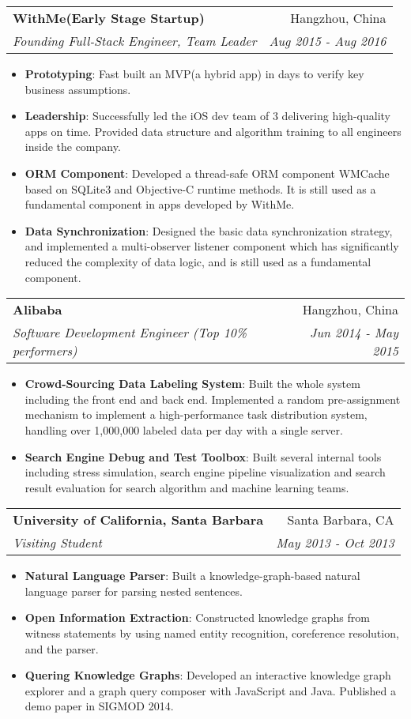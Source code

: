 \documentclass[letterpaper,9pt]{article}
\makeatletter
\newcommand{\resumeItem}[2]{
  \item\small{
    \textbf{#1}{: #2 \vspace{-2pt}}
  }
}
\newcommand{\resumeSubheading}[4]{
  \vspace{-1pt}\item
    \begin{tabular*}{0.97\textwidth}{l@{\extracolsep{\fill}}r}
      \textbf{#1} & #2 \\
      \textit{\small#3} & \textit{\small #4} \\
    \end{tabular*}\vspace{-5pt}
}
\newcommand{\resumeItemListStart}{\begin{itemize}}
\newcommand{\resumeItemListEnd}{\end{itemize}\vspace{-5pt}}
\makeatother
\begin{document}
    \resumeSubheading
      {WithMe(Early Stage Startup)}{Hangzhou, China}
      {Founding Full-Stack Engineer, Team Leader}{Aug 2015 - Aug 2016}
      \resumeItemListStart
        \resumeItem{Prototyping}
          {Fast built an MVP(a hybrid app) in days to verify key business assumptions.}
        \resumeItem{Leadership}
          {Successfully led the iOS dev team of 3 delivering high-quality apps on time. Provided data structure and  algorithm training to all engineers inside the company.}
        \resumeItem{ORM Component}
          {Developed a thread-safe ORM component WMCache based on SQLite3 and Objective-C runtime methods. It is still used as a fundamental component in apps developed by WithMe.}
        \resumeItem{Data Synchronization}
          {Designed the basic data synchronization strategy, and implemented a multi-observer listener component which has significantly reduced the complexity of data logic, and is still used as a fundamental component.}
      \resumeItemListEnd

    \resumeSubheading
      {Alibaba}{Hangzhou, China}
      {Software Development Engineer (Top 10\% performers)}{Jun 2014 - May 2015}
      \resumeItemListStart
        \resumeItem{Crowd-Sourcing Data Labeling System}
          {Built the whole system including the front end and back end. Implemented a random pre-assignment mechanism to implement a high-performance task distribution system, handling over 1,000,000 labeled data per day with a single server.}
        \resumeItem{Search Engine Debug and Test Toolbox}
          {Built several internal tools including stress simulation, search engine pipeline visualization and search result evaluation for search algorithm and machine learning teams. }
      \resumeItemListEnd

    \resumeSubheading
      {University of California, Santa Barbara}{Santa Barbara, CA}
      {Visiting Student}{May 2013 - Oct 2013}
      \resumeItemListStart
        \resumeItem{Natural Language Parser}
          {Built a knowledge-graph-based natural language parser for parsing nested sentences.}
        \resumeItem{Open Information Extraction}
          {Constructed knowledge graphs from witness statements by using named entity recognition, coreference resolution, and the parser.}
        \resumeItem{Quering Knowledge Graphs}
          {Developed an interactive knowledge graph explorer and a graph query composer with JavaScript and Java. Published a demo paper in SIGMOD 2014.}
      \resumeItemListEnd
\end{document}
